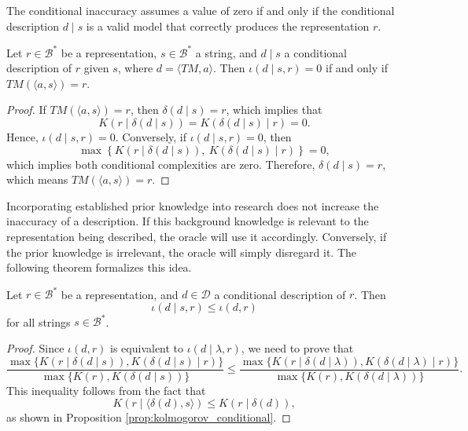 The conditional inaccuracy assumes a value of zero if and only if the conditional description $d \mid s$ is a valid model that correctly produces the representation $r$.

\begin{proposition}
\label{prop:perfect_conditional_description}
Let $r \in \mathcal{B}^\ast$ be a representation, $s \in \mathcal{B}^\ast$ a string, and $d \mid s$ a conditional description of $r$ given $s$, where $d = \langle TM, a \rangle$. Then $\iota(d \mid s, r) = 0$ if and only if $TM \left(\langle a, s \rangle \right) = r$.
\end{proposition}
\begin{proof}
If $TM \left(\langle a, s \rangle \right) = r$, then $\delta(d \mid s) = r$, which implies that
\[
K \left( r \mid \delta(d \mid s) \right) = K \left( \delta(d \mid s) \mid r \right) = 0.
\]
Hence, $\iota(d \mid s, r) = 0$. Conversely, if $\iota(d \mid s, r) = 0$, then
\[
\max\left\{ K \left( r \mid \delta(d \mid s) \right),\ K \left( \delta(d \mid s) \mid r \right) \right\} = 0,
\]
which implies both conditional complexities are zero. Therefore, $\delta(d \mid s) = r$, which means $TM \left(\langle a, s \rangle \right) = r$.
\end{proof}

Incorporating established prior knowledge into research does not increase the inaccuracy of a description. If this background knowledge is relevant to the representation being described, the oracle will use it accordingly. Conversely, if the prior knowledge is irrelevant, the oracle will simply disregard it. The following theorem formalizes this idea.

\begin{theorem}
\label{th:conditional_inaccuracy}
Let $r \in \mathcal{B}^\ast$ be a representation, and $d \in \mathcal{D}$ a conditional description of $r$. Then
\[
\iota(d \mid s, r) \leq \iota(d , r)
\]
for all strings $s \in \mathcal{B}^\ast$.
\end{theorem}
\begin{proof}
Since $\iota(d, r)$ is equivalent to $\iota(d \mid \lambda, r)$, we need to prove that
\[
\frac{ \max\{ K \left(r \mid \delta(d \mid s) \right), K \left( \delta(d \mid s) \mid r \right) \} } { \max\{ K(r), K \left( \delta(d \mid s) \right) \} } \leq \frac{ \max\{ K \left(r \mid \delta(d \mid \lambda ) \right), K \left( \delta(d \mid \lambda ) \mid r \right) \} } { \max\{ K(r), K \left( \delta(d \mid \lambda ) \right) \} }.
\]
This inequality follows from the fact that
\[
K \left(r \mid \langle \delta(d), s \rangle \right) \leq K \left(r \mid \delta(d) \right),
\]
as shown in Proposition \ref{prop:kolmogorov_conditional}.
\end{proof}

